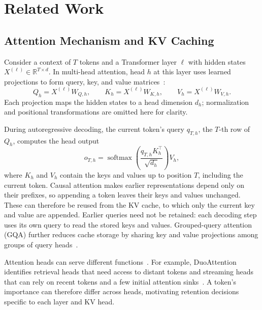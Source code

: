 \section{Related Work}
\label{sec:related}

\subsection{Attention Mechanism and KV Caching}
Consider a context of $T$ tokens and a Transformer layer $\ell$ with hidden states $X^{(\ell)}\in\mathbb{R}^{T\times d}$. In multi-head attention, head $h$ at this layer uses learned projections to form query, key, and value matrices~\citep{vaswani2017attention}:
\begin{equation}
    Q_h=X^{(\ell)}W_{Q,h},\qquad
    K_h=X^{(\ell)}W_{K,h},\qquad
    V_h=X^{(\ell)}W_{V,h}.
    \label{eq:qkv-projections}
\end{equation}
Each projection maps the hidden states to a head dimension $d_h$; normalization and positional transformations are omitted here for clarity.

During autoregressive decoding, the current token's query $q_{T,h}$, the $T$-th row of $Q_h$, computes the head output
\begin{equation}
    o_{T,h}=\operatorname{softmax}\!\left(
    \frac{q_{T,h}K_h^{\top}}{\sqrt{d_h}}
    \right)V_h,
    \label{eq:cached-attention}
\end{equation}
where $K_h$ and $V_h$ contain the keys and values up to position $T$, including the current token. Causal attention makes earlier representations depend only on their prefixes, so appending a token leaves their keys and values unchanged. These can therefore be reused from the KV cache, to which only the current key and value are appended. Earlier queries need not be retained: each decoding step uses its own query to read the stored keys and values. Grouped-query attention (GQA) further reduces cache storage by sharing key and value projections among groups of query heads~\citep{ainslie2023gqa}.

Attention heads can serve different functions~\citep{voita2019heads}. For example, DuoAttention identifies retrieval heads that need access to distant tokens and streaming heads that can rely on recent tokens and a few initial attention sinks~\citep{xiao2025duoattention}. A token's importance can therefore differ across heads, motivating retention decisions specific to each layer and KV head.

